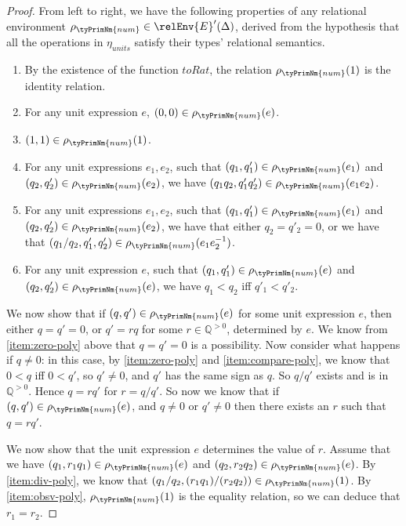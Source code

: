 \begin{proof}
  From left to right, we have the following properties of any
  relational environment $\rho_{\tyPrimNm{num}} \in
  \relEnv{E}'(\Delta)$, derived from the hypothesis that all the
  operations in $\eta_{\mathit{units}}$ satisfy their types'
  relational semantics.
  \begin{enumerate}
  \item\label{item:obsv-poly} By the existence of the function
    $\mathit{toRat}$, the relation $\rho_{\tyPrimNm{num}}(1)$ is the
    identity relation.
  \item\label{item:zero-poly} For any unit expression $e$, $(0,0) \in
    \rho_{\tyPrimNm{num}}(e)$.
  \item \label{item:one-poly} $(1,1) \in \rho_{\tyPrimNm{num}}(1)$.
  \item \label{item:mult-poly} For any unit expressions $e_1,e_2$,
    such that $(q_1,q'_1) \in \rho_{\tyPrimNm{num}}(e_1)$ and
    $(q_2,q'_2) \in \rho_{\tyPrimNm{num}}(e_2)$, we have $(q_1q_2,
    q'_1q'_2) \in \rho_{\tyPrimNm{num}}(e_1e_2)$.
  \item\label{item:div-poly} For any unit expressions $e_1,e_2$, such
    that $(q_1,q'_1) \in \rho_{\tyPrimNm{num}}(e_1)$ and $(q_2,q'_2)
    \in \rho_{\tyPrimNm{num}}(e_2)$, we have that either $q_2 = q'_2 =
    0$, or we have that $(q_1/q_2,q'_1,q'_2) \in
    \rho_{\tyPrimNm{num}}(e_1e_2^{-1})$.
  \item\label{item:compare-poly} For any unit expression $e$, such
    that $(q_1,q'_1) \in \rho_{\tyPrimNm{num}}(e)$ and $(q_2,q'_2) \in
    \rho_{\tyPrimNm{num}}(e)$, we have $q_1 < q_2$ iff $q'_1 < q'_2$.
  \end{enumerate}
  We now show that if $(q,q') \in \rho_{\tyPrimNm{num}}(e)$ for some
  unit expression $e$, then either $q = q' = 0$, or $q' = rq$ for some
  $r \in \mathbb{Q}^{>0}$, determined by $e$. We know from
  \ref{item:zero-poly} above that $q = q' = 0$ is a possibility. Now
  consider what happens if $q \not= 0$: in this case, by
  \ref{item:zero-poly} and \ref{item:compare-poly}, we know that $0 <
  q$ iff $0 < q'$, so $q' \not= 0$, and $q'$ has the same sign as
  $q$. So $q/q'$ exists and is in $\mathbb{Q}^{>0}$. Hence $q = rq'$
  for $r = q/q'$. So now we know that if $(q,q') \in
  \rho_{\tyPrimNm{num}}(e)$, and $q \not= 0$ or $q' \not= 0$ then
  there exists an $r$ such that $q = rq'$.

  We now show that the unit expression $e$ determines the value of
  $r$. Assume that we have $(q_1,r_1q_1) \in \rho_{\tyPrimNm{num}}(e)$
  and $(q_2,r_2q_2) \in \rho_{\tyPrimNm{num}}(e)$. By
  \ref{item:div-poly}, we know that $(q_1/q_2, (r_1q_1)/(r_2q_2)) \in
  \rho_{\tyPrimNm{num}}(1)$. By \ref{item:obsv-poly},
  $\rho_{\tyPrimNm{num}}(1)$ is the equality relation, so we can
  deduce that $r_1 = r_2$.


\end{proof}
